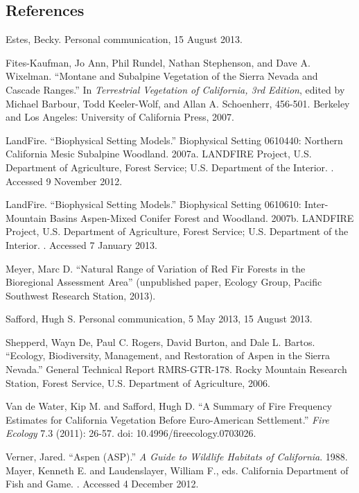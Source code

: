 \subsection*{References}
\begin{hangparas}{.25in}{1} 
Estes, Becky. Personal communication, 15 August 2013.

Fites-Kaufman, Jo Ann, Phil Rundel, Nathan Stephenson, and Dave A. Wixelman. ``Montane and Subalpine Vegetation of the Sierra Nevada and Cascade Ranges.'' In \emph{Terrestrial Vegetation of California, 3rd Edition}, edited by Michael Barbour, Todd Keeler-Wolf, and Allan A. Schoenherr, 456-501. Berkeley and Los Angeles: University of California Press, 2007. 

LandFire. ``Biophysical Setting Models.'' Biophysical Setting 0610440: Northern California Mesic Subalpine Woodland. 2007a. LANDFIRE Project, U.S. Department of Agriculture, Forest Service; U.S. Department of the Interior. . Accessed 9 November 2012.

LandFire. ``Biophysical Setting Models.'' Biophysical Setting 0610610: Inter-Mountain Basins Aspen-Mixed Conifer Forest and Woodland. 2007b. LANDFIRE Project, U.S. Department of Agriculture, Forest Service; U.S. Department of the Interior. . Accessed 7 January 2013.

Meyer, Marc D. ``Natural Range of Variation of Red Fir Forests in the Bioregional Assessment Area'' (unpublished paper, Ecology Group, Pacific Southwest Research Station, 2013).

Safford, Hugh S. Personal communication, 5 May 2013, 15 August 2013.

Shepperd, Wayn De, Paul C. Rogers, David Burton, and Dale L. Bartos. ``Ecology, Biodiversity, Management, and Restoration of Aspen in the Sierra Nevada.'' General Technical Report RMRS-GTR-178. Rocky Mountain Research Station, Forest Service, U.S. Department of Agriculture, 2006.

Van de Water, Kip M. and Safford, Hugh D. ``A Summary of Fire Frequency Estimates for California Vegetation Before Euro-American Settlement.'' \emph{Fire Ecology} 7.3 (2011): 26-57. doi: 10.4996/fireecology.0703026.

Verner, Jared. ``Aspen (ASP).'' \emph{A Guide to Wildlife Habitats of California}. 1988. Mayer, Kenneth E. and Laudenslayer, William F., eds. California Department of Fish and Game. . Accessed 4 December 2012.

\end{hangparas}

